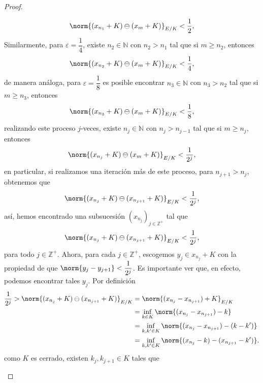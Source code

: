 \begin{proof}
\begin{enumerate}
\begin{enumerate}
        \begin{align*}
            \norm{(x_{n_1}+K)\ominus(x_{m}+K)}_{E/K}<\dfrac{1}{2},
        \end{align*}
        Similarmente, para $\varepsilon=\dfrac{1}{4}$, existe $n_2\in \mathbb{N}$ con $n_2>n_1$ tal que si $m\geq n_2$, entonces
        \begin{align*}
            \norm{(x_{n_2}+K)\ominus
            (x_m+K)}_{E/K}<\dfrac{1}{4},
        \end{align*}
        de manera análoga, para $\varepsilon=\dfrac{1}{8}$ es posible encontrar $n_3\in \mathbb{N}$ con $n_3>n_2$ tal que si $m\geq n_3$, entonces
        \begin{align*}
            \norm{(x_{n_3}+K)\ominus(x_m+K)}_{E/K}<\dfrac{1}{8},
        \end{align*}
        realizando este proceso $j$-veces, existe $n_j\in \mathbb{N}$ con $n_{j}>n_{j-1}$ tal que si $m\geq n_j$, entonces
        \begin{align*}
            \norm{(x_{n_j}+K)\ominus(x_m+K)}_{E/K}<\dfrac{1}{2^j},
        \end{align*}
        en particular, si realizamos una iteración más de este proceso, para $n_{j+1}>n_j$, obtenemos que
        \begin{align*}
            \norm{(x_{n_j}+K)\ominus(x_{n_{j+1}}+K)}_{E/K}<\dfrac{1}{2^j},
        \end{align*}
        así, hemos encontrado una subsucesión $(x_{n_j})_{j \in \mathbb{Z}^+}$ tal que 
        \begin{align*}
            \norm{(x_{n_j}+K)\ominus(x_{n_{j+1}}+K)}_{E/K}<\dfrac{1}{2^j},
        \end{align*}
        para todo $j \in \mathbb{Z}^+$. Ahora, para cada $j \in \mathbb{Z}^+$, escogemos $y_j \in x_{n_j}+K$ con la propiedad de que $\norm{y_j-y_{j+1}}<\dfrac{1}{2^j}$. Es importante ver que, en efecto, podemos encontrar tales $y_j$. Por definición 
        \begin{align*}
            \frac{1}{2^j}>\norm{(x_{n_j}+K)\ominus(x_{n_{j+1}}+K)}_{E/K}&=\norm{(x_{n_j}-x_{n_{j+1}})+K}_{E/K}\\
            &=\inf_{k \in K} \norm{(x_{n_j}-x_{n_{j+1}})-k}\\
            &=\inf_{k,k'\in K}\norm{(x_{n_j}-x_{n_{j+1}})-(k-k')}\\
            &=\inf_{k,k'\in K}\norm{(x_{n_j}-k)-(x_{n_{j+1}}-k')}.
        \end{align*}
        como $K$ es cerrado, existen $k_j,k_{j+1}\in K$ tales que 

\end{enumerate}
\end{enumerate}
\end{proof}
